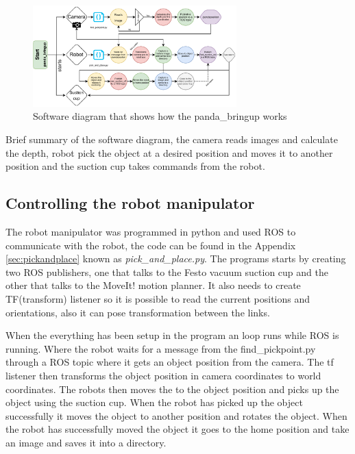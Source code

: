 \begin{figure}[h]
    \centering
    \includegraphics[width=0.7\textwidth]{graphics/softwareDiagram.pdf}
    \caption{Software diagram that shows how the panda\_bringup works}
    \label{fig:softwarediagram}
\end{figure}

Brief summary of the software diagram, the camera reads images and calculate the depth, robot pick the object at a desired position and moves it to another position and the suction cup takes commands from the robot.

\subsection{Controlling the robot manipulator}\label{robotcontrol}
The robot manipulator was programmed in python and used ROS to communicate with the robot, the code can be found in the Appendix \ref{sec:pickandplace} known as \textit{pick\_and\_place.py}. 
The programs starts by creating two ROS publishers, one that talks to the Festo vacuum suction cup and the other that talks to the MoveIt! motion planner. 
It also needs to create TF(transform) listener so it is possible to read the current positions and orientations, also it can pose transformation between the links. 

When the everything has been setup in the program an loop runs while ROS is running. 
Where the robot waits for a message from the find\_pickpoint.py through a ROS topic where it gets an object position from the camera.
The tf listener then transforms the object position in camera coordinates to world coordinates. The robots then moves the to the object position and picks up the object using the suction cup. When the robot has picked up the object successfully it moves the object to another position and rotates the object. When the robot has successfully moved the object it goes to the home position and take an image and saves it into a directory. 


